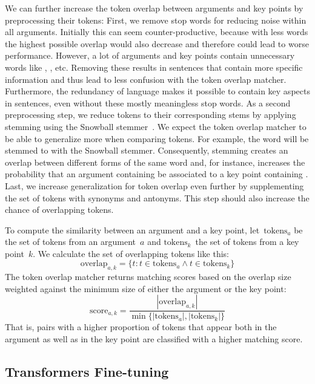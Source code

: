 We can further increase the token overlap between arguments and key points by preprocessing their tokens:
First, we remove stop words for reducing noise within all arguments.
Initially this can seem counter-productive, because with less words the highest possible overlap would also decrease and therefore could lead to worse performance.
However, a lot of arguments and key points contain unnecessary words like , ,  etc.
Removing these results in sentences that contain more specific information and thus lead to less confusion with the token overlap matcher.
Furthermore, the redundancy of language makes it possible to contain key aspects in sentences, even without these mostly meaningless stop words.
As a second preprocessing step, we reduce tokens to their corresponding stems by applying stemming using the Snowball stemmer~\cite{Porter1980}. 
We expect the token overlap matcher to be able to generalize more when comparing tokens.
For example, the word  will be stemmed to  with the Snowball stemmer. 
Consequently, stemming creates an overlap between different forms of the same word and, for instance, increases the probability that an argument containing  be associated to a key point containing .
Last, we increase generalization for token overlap even further by supplementing the set of tokens with synonyms and antonyms. This step should also increase the chance of overlapping tokens.

To compute the similarity between an argument and a key point, let~\(\text{tokens}_a\) be the set of tokens from an argument~\(a\) and \(\text{tokens}_k\)~the set of tokens from a key point~\(k\).
We calculate the set of overlapping tokens like this:
\begin{equation}
    \text{overlap}_{a,k} = \{ t : t \in \text{tokens}_a \land t \in \text{tokens}_k \}
\end{equation}
The token overlap matcher returns matching scores based on the overlap size weighted against the minimum size of either the argument or the key point:
\begin{equation}
    \text{score}_{a,k} = \frac{ |\text{overlap}_{a,k}| }{ \min\{ |\text{tokens}_a|, |\text{tokens}_k| \} }
\end{equation}
That is, pairs with a higher proportion of tokens that appear both in the argument as well as in the key point are classified with a higher matching score.

\subsection{Transformers Fine-tuning}

